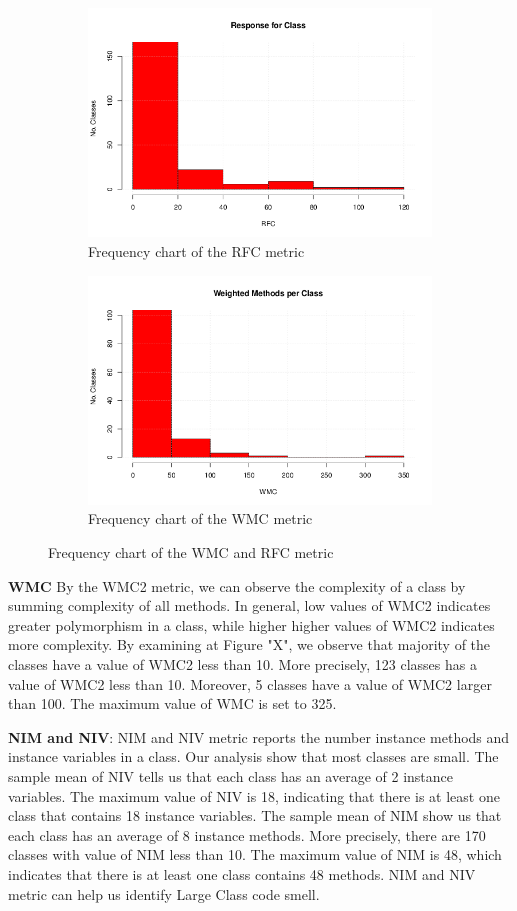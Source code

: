 \begin{figure}[!tbp]
\centering
\begin{subfigure}{\textwidth}
	\centering
	\includegraphics[width=.5\textwidth]{images/RFC.png}
	\caption{Frequency chart of the RFC metric}
	\label{fig:rfcdistribution}
\end{subfigure}
\begin{subfigure}{\textwidth}
	\centering
	\includegraphics[width=.5\textwidth]{images/WMC.png}
	\caption{Frequency chart of the WMC metric}
	\label{fig:wmcdistribution}
\end{subfigure}
\caption{Frequency chart of the WMC and RFC metric}
\end{figure}

\textbf{WMC} By the WMC2 metric, we can observe the complexity of a class by summing complexity of all methods. In general, low values of WMC2 indicates greater polymorphism in a class, while higher higher values of WMC2 indicates more complexity. By examining at Figure "X", we observe that majority of the classes have a value of WMC2 less than 10. More precisely, 123 classes has a value of WMC2 less than 10. Moreover, 5 classes have a value of WMC2 larger than 100. The maximum value of WMC is set to 325.

\textbf{NIM and NIV}: NIM and NIV metric reports the number instance methods and instance variables in a class. Our analysis show that most classes are small. The sample mean of NIV tells us that each class has an average of 2 instance variables. The maximum value of NIV is 18, indicating that there is at least one class that contains 18 instance variables. The sample mean of NIM show us that each class has an average of 8 instance methods. More precisely, there are 170 classes with value of NIM less than 10. The maximum value of NIM is 48, which indicates that there is at least one class contains 48 methods. NIM and NIV metric can help us identify Large Class code smell.

